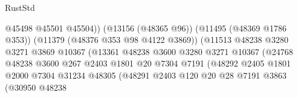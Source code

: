 \begin{lexlean}{RustStd}
\begin{coremodule}
                                                    @45498
                                                    @45501
                                                    @45504))
                                                (@13156 (@48365 @96))
                                                (@11495 (@48369 @1786 @353))
                                                (@11379 (@48376 @353 @98 @4122 @3869))
                                                (@11513
                                                  @48238
                                                  @3280
                                                  @3271
                                                  @3869
                                                  @10367
                                                  (@13361
                                                    @48238
                                                    @3600
                                                    @3280
                                                    @3271
                                                    @10367
                                                    (@24768
                                                      @48238
                                                      @3600
                                                      @267
                                                      @2403
                                                      @1801
                                                      @20
                                                      @7304
                                                      @7191
                                                      (@48292
                                                        @2405
                                                        @1801
                                                        @2000
                                                        @7304
                                                        @31234
                                                        @48305
                                                        (@48291
                                                          @2403
                                                          @120
                                                          @20
                                                          @28
                                                          @7191
                                                          @3863
                                                          (@30950
                                                            @48238

\end{coremodule}
\end{lexlean}
